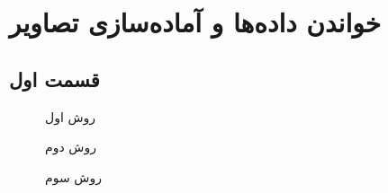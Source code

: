 \chapter{خواندن داده‌ها و آماده‌سازی تصاویر}

\ptext[1]

\section{قسمت اول}

\ptext[2]
\ptext[3]
\cite{fieldtrip-prepare_mesh_segmentation.m}

\begin{figure}[t!]
	\centering
	\removevspace
	\caption{روش اول}
	\label{fig:method1-isosurface}
\end{figure}



\begin{figure}[t!]
	\centering
	\removevspace
	\caption{روش دوم}
	\label{fig:method2-isosurface}
\end{figure}



\begin{figure}[t!]
	\centering
	\removevspace
	\caption{روش سوم}
	\label{fig:method3-bwperim3}
\end{figure}
















